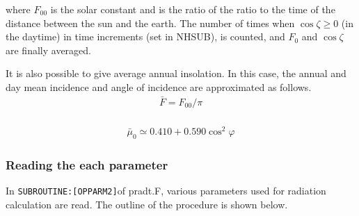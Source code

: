 where \(F_{00}\) is the solar constant and is the ratio of the ratio to
the time of the distance between the sun and the earth. The number of
times when \(\cos \zeta \geq 0\) (in the daytime) in time increments
(set in NHSUB), is counted, and \(F_{0}\) and \(\cos \zeta\) are finally
averaged.

It is also possible to give average annual insolation. In this case, the
annual and day mean incidence and angle of incidence are approximated as
follows. \begin{equation}
\begin{array}{c}
\bar{F}=F_{00} / \pi \\
\end{array}
\end{equation}

\begin{equation}
\begin{array}{c}
\bar{\mu}_{0} \simeq 0.410+0.590 \cos ^{2} \varphi
\end{array}
\end{equation}

\hypertarget{reading-the-each-parameter}{%
\subsubsection{Reading the each
parameter}\label{reading-the-each-parameter}}

In \texttt{SUBROUTINE:{[}OPPARM2{]}}of pradt.F, various parameters used
for radiation calculation are read. The outline of the procedure is
shown below.

